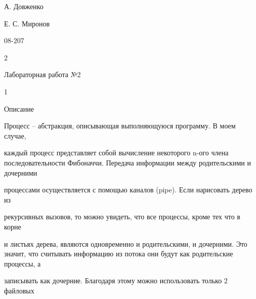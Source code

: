 \documentclass[a4paper,portrait,12pt]{article}
\begin{document}
\begin{flushleft}
А. Довженко
\end{flushleft}


\begin{flushleft}
Е. С. Миронов
\end{flushleft}


08-207


2





\begin{flushleft}
\newpage
Лабораторная работа №2
\end{flushleft}


1





\begin{flushleft}
Описание
\end{flushleft}





\begin{flushleft}
Процесс -- абстракция, описывающая выполняющуюся программу. В моем случае,
\end{flushleft}


\begin{flushleft}
каждый процесс представляет собой вычисление некоторого n-ого члена последовательности Фибоначчи. Передача информации между родительскими и дочерними
\end{flushleft}


\begin{flushleft}
процессами осуществляется с помощью каналов (pipe). Если нарисовать дерево из
\end{flushleft}


\begin{flushleft}
рекурсивных вызовов, то можно увидеть, что все процессы, кроме тех что в корне
\end{flushleft}


\begin{flushleft}
и листьях дерева, являются одновременно и родительскими, и дочерними. Это значит, что считывать информацию из потока они будут как родительские процессы, а
\end{flushleft}


\begin{flushleft}
записывать как дочерние. Благодаря этому можно использовать только 2 файловых
\end{flushleft}
\end{document}
